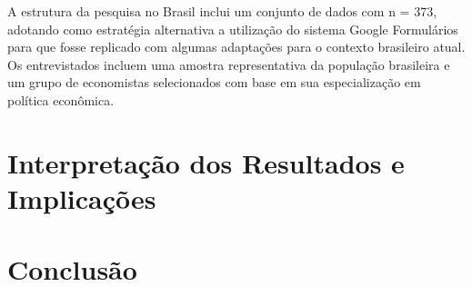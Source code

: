 A estrutura da pesquisa no Brasil inclui um conjunto de dados com n = 373, adotando como estratégia alternativa a utilização do sistema Google Formulários para que fosse replicado com algumas adaptações para o contexto brasileiro atual. Os entrevistados incluem uma amostra representativa da população brasileira e um grupo de economistas selecionados com base em sua especialização em política econômica.



\section{Interpretação dos Resultados e Implicações}

\section{Conclusão}

